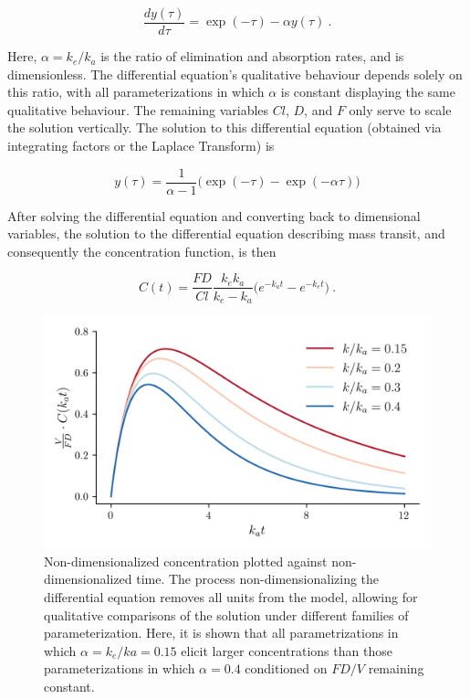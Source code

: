 \begin{equation}
	\dfrac{dy(\tau)}{d\tau} = \exp(-\tau) - \alpha y(\tau) \>.
\end{equation}


\noindent Here, $\alpha = k_e / k_a$ is the ratio of elimination and absorption rates, and is dimensionless.  The differential equation's qualitative behaviour depends solely on this ratio, with all parameterizations in which $\alpha$ is constant displaying the same qualitative behaviour.  The remaining variables $Cl$, $D$, and $F$ only serve to scale the solution vertically.  The solution to this differential equation (obtained via integrating factors or the Laplace Transform) is

\begin{equation}\label{key}
	y(\tau) = \dfrac{1}{\alpha -1} \Big( \exp(-\tau) - \exp(-\alpha \tau) \Big)
\end{equation}

\noindent After solving the differential equation and converting back to dimensional variables, the solution to the differential equation describing mass transit, and consequently the concentration function, is then

\begin{equation}\label{onecompartment_PKPD}
	C(t) = \dfrac{F D}{Cl}\dfrac{k_ek_a}{k_e - k_a}\Big(e^{-k_at} - e^{-k_et}\Big) \>.
\end{equation}


\begin{figure}[h!]
	\centering
	\includegraphics{figures/pkcurves.png}
	\caption[Non-dimensionalized solutions to pharmacokinetic differential equation] {Non-dimensionalized concentration plotted against non-dimensionalized time.  The process non-dimensionalizing the differential equation removes all units from the model, allowing for qualitative comparisons of the solution under different families of parameterization.  Here, it is shown that all parametrizations in which $\alpha = k_e/ka = 0.15$ elicit larger concentrations than those parameterizations in which $\alpha=0.4$ conditioned on $FD/V$ remaining constant.}
	\label{fig:pkcureves}
\end{figure}


